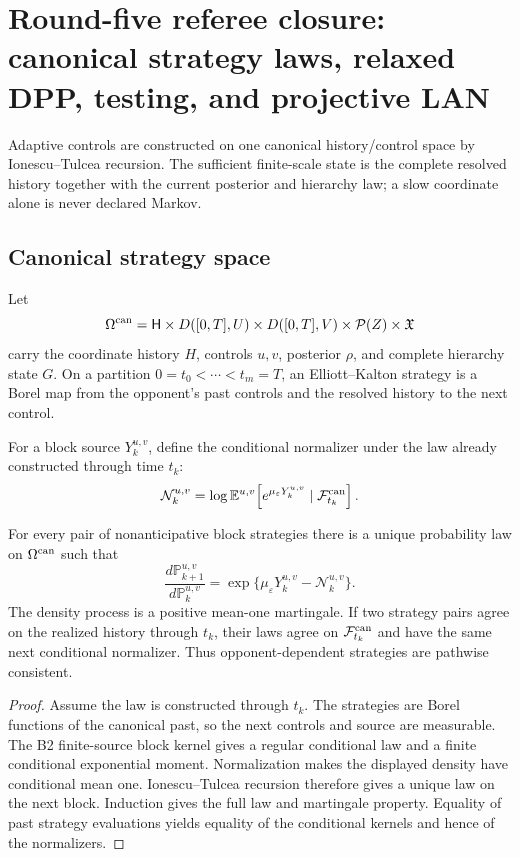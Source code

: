 \section{Round-five referee closure: canonical strategy laws, relaxed DPP, testing, and projective LAN}
\label{sec:r5-c1}

Adaptive controls are constructed on one canonical history/control space by
Ionescu--Tulcea recursion.  The sufficient finite-scale state is the complete
resolved history together with the current posterior and hierarchy law; a
slow coordinate alone is never declared Markov.

\subsection{Canonical strategy space}

Let
\[
 \Omega^{\rm can}
 =
 {\mathsf H}\times
 D([0,T],U)\times D([0,T],V)\times
 {\mathcal P}(Z)\times{\mathfrak X}
\]
carry the coordinate history \(H\), controls \(u,v\), posterior \(\rho\),
and complete hierarchy state \(G\).  On a partition
\(0=t_0<\cdots<t_m=T\), an Elliott--Kalton strategy is a Borel map from the
opponent's past controls and the resolved history to the next control.

For a block source \(Y_k^{u,v}\), define the conditional normalizer under the
law already constructed through time \(t_k\):
\[
 {\mathcal N}_k^{u,v}
 =
 \log\mathbb E^{u,v}\!\left[
 e^{\mu_\varepsilon Y_k^{u,v}}
 \mid{\mathcal F}^{\rm can}_{t_k}\right].
\]

\begin{theorem}
\label{thm:r5-c1-law}
For every pair of nonanticipative block strategies there is a unique
probability law on \(\Omega^{\rm can}\) such that
\[
 \frac{d\mathbb P^{u,v}_{k+1}}
      {d\mathbb P^{u,v}_{k}}
 =
 \exp\{\mu_\varepsilon Y_k^{u,v}-{\mathcal N}_k^{u,v}\}.
\]
The density process is a positive mean-one martingale.  If two strategy pairs
agree on the realized history through \(t_k\), their laws agree on
\({\mathcal F}^{\rm can}_{t_k}\) and have the same next conditional
normalizer.  Thus opponent-dependent strategies are pathwise consistent.
\end{theorem}

\begin{proof}
Assume the law is constructed through \(t_k\).  The strategies are Borel
functions of the canonical past, so the next controls and source are
measurable.  The B2 finite-source block kernel gives a regular conditional
law and a finite conditional exponential moment.  Normalization makes the
displayed density have conditional mean one.  Ionescu--Tulcea recursion
therefore gives a unique law on the next block.  Induction gives the full law
and martingale property.  Equality of past strategy evaluations yields
equality of the conditional kernels and hence of the normalizers.
\end{proof}

